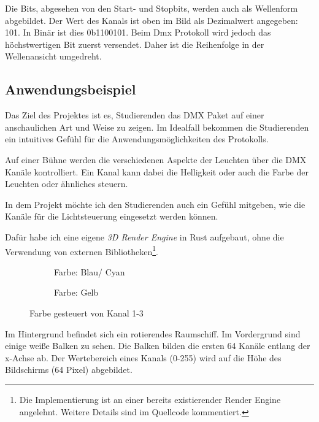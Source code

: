 Die Bits, abgesehen von den Start- und Stopbits, werden auch als Wellenform abgebildet. Der Wert des Kanals ist oben im Bild als Dezimalwert angegeben: 101. In Binär ist dies 0b1100101. Beim Dmx Protokoll wird jedoch das höchstwertigen Bit zuerst versendet. Daher ist die Reihenfolge in der Wellenansicht umgedreht.

\subsection{Anwendungsbeispiel}

Das Ziel des Projektes ist es, Studierenden das DMX Paket auf einer anschaulichen Art und Weise zu zeigen. Im Idealfall bekommen die Studierenden ein intuitives Gefühl für die Anwendungsmöglichkeiten des Protokolls.

Auf einer Bühne werden die verschiedenen Aspekte der Leuchten über die DMX Kanäle kontrolliert. Ein Kanal kann dabei die Helligkeit oder auch die Farbe der Leuchten oder ähnliches steuern.

In dem Projekt möchte ich den Studierenden auch ein Gefühl mitgeben, wie die Kanäle für die Lichtsteuerung eingesetzt werden können.

Dafür habe ich eine eigene \emph{3D Render Engine} in Rust aufgebaut, ohne die Verwendung von externen Bibliotheken\footnote{Die Implementierung ist an einer bereits existierender Render Engine angelehnt. Weitere Details sind im Quellcode kommentiert.}.

\begin{figure}[H]
	\centering
	\begin{subfigure}{.5\textwidth}
		\centering
		\caption{Farbe: Blau/ Cyan}
		\label{fig:renderSpaceshipCyan}
	\end{subfigure}%
	\begin{subfigure}{.5\textwidth}
		\centering
		\caption{Farbe: Gelb}
		\label{fig:renderSpaceshipYellow}
	\end{subfigure}
	\caption{Farbe gesteuert von Kanal 1-3}
	\label{fig:spaceship_renderes}
\end{figure}

Im Hintergrund befindet sich ein rotierendes Raumschiff. Im Vordergrund sind einige weiße Balken zu sehen. Die Balken bilden die ersten 64 Kanäle entlang der x-Achse ab. Der Wertebereich eines Kanals (0-255) wird auf die Höhe des Bildschirms (64 Pixel) abgebildet.

